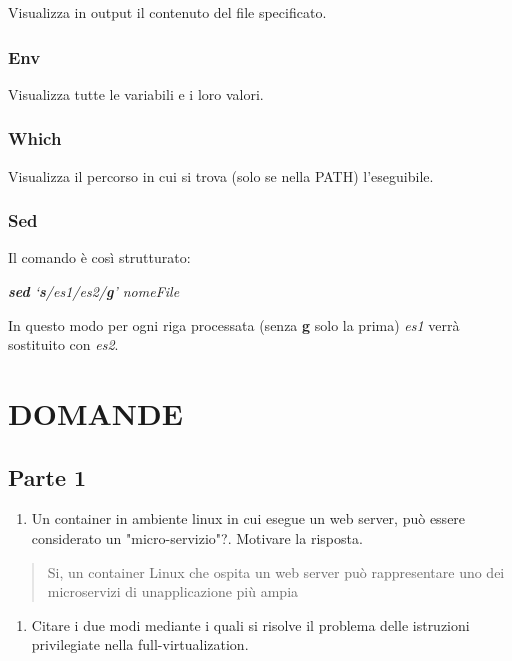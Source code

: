 Visualizza in output il contenuto del file specificato.

\subsubsection{Env}\label{env}

Visualizza tutte le variabili e i loro valori.

\subsubsection{Which}\label{which}

Visualizza il percorso in cui si trova (solo se nella PATH)
l'eseguibile.

\subsubsection{Sed}\label{sed}

Il comando è così strutturato:

\emph{\textbf{sed} `\textbf{s}/es1/es2/\textbf{g}' nomeFile}

In questo modo per ogni riga processata (senza \textbf{g} solo la prima)
\emph{es1} verrà sostituito con \emph{es2}.

\section{DOMANDE}\label{domande}

\subsection{Parte 1}\label{parte-1}

\begin{enumerate}
\def\labelenumi{\arabic{enumi}.}
\item
  Un container in ambiente linux in cui esegue un web server, può essere
  considerato un "micro-servizio"?. Motivare la risposta.
\end{enumerate}

\begin{quote}
Si, un container Linux che ospita un web server può rappresentare uno
dei microservizi di un\textquotesingle applicazione più ampia
\end{quote}

\begin{enumerate}
\def\labelenumi{\arabic{enumi}.}
\setcounter{enumi}{1}
\item
  Citare i due modi mediante i quali si risolve il problema delle
  istruzioni privilegiate nella full-virtualization.
\end{enumerate}

